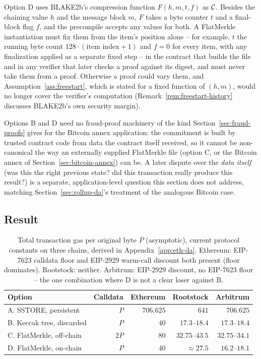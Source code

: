 Option D uses BLAKE2b's compression function $F(h, m, t, f)$ as $\mathcal{C}$. Besides
the chaining value $h$ and the message block $m$, $F$ takes a byte counter
$t$ and a final-block flag $f$, and the precompile accepts any values for
both. A FlatMerkle instantiation must fix them from the item's position
alone -- for example, $t$ the running byte count $128 \cdot (\text{item
index} + 1)$ and $f = 0$ for every item, with any finalization applied as a
separate fixed step -- in the contract that builds the file and in any verifier that
later checks a proof against its digest, and must never take them from a
proof. Otherwise a proof could vary them, and
Assumption~\ref{ass:freestart}, which is stated for a fixed function of
$(h,m)$, would no longer cover the verifier's computation
(Remark~\ref{rem:freestart-history} discusses BLAKE2b's own security
margin).

Options B and D need no fraud-proof machinery of the kind
Section~\ref{sec:fraud-proofs} gives for the Bitcoin annex application: the
commitment is built by trusted contract code from data the contract itself
received, so it cannot be non-canonical the way an externally supplied
FlatMerkle file (option C, or the Bitcoin annex of
Section~\ref{sec:bitcoin-annex}) can be. A later dispute over the
\emph{data itself} (was this the right previous state? did this transaction
really produce this result?) is a separate, application-level question this
section does not address, matching Section~\ref{sec:rollup-da}'s treatment
of the analogous Bitcoin case.

\subsection{Result}
\label{sec:rollup-eth-results}

\begin{table}[htbp]
\centering
\begin{tabular}{@{}lrrrr@{}}
\toprule
Option & Calldata & Ethereum & Rootstock & Arbitrum \\
\midrule
A. SSTORE, persistent      & $P$  & $706.625$ & $641$            & $706.625$ \\
B. Keccak tree, discarded  & $P$  & $40$      & $17.3$--$18.4$   & $17.3$--$18.4$ \\
C. FlatMerkle, off-chain   & $2P$ & $80$      & $32.75$--$43.5$  & $32.75$--$34.1$ \\
D. FlatMerkle, on-chain    & $P$  & $40$      & $\approx\!27.5$  & $16.2$--$18.1$ \\
\bottomrule
\end{tabular}
\caption{Total transaction gas per original byte $P$ (asymptotic),
current protocol constants on three chains, derived in
Appendix~\ref{app:eth-da}. Ethereum: EIP-7623 calldata floor and EIP-2929
warm-call discount both present (floor dominates). Rootstock: neither.
Arbitrum: EIP-2929 discount, no EIP-7623 floor -- the one combination
where D is not a clear loser against B.}
\label{tab:eth-da-costs}
\end{table}


